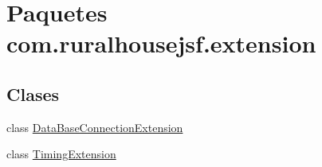 \hypertarget{namespacecom_1_1ruralhousejsf_1_1extension}{}\section{Paquetes com.\+ruralhousejsf.\+extension}
\label{namespacecom_1_1ruralhousejsf_1_1extension}
\subsection*{Clases}
\begin{DoxyCompactItemize}
\item 
class \mbox{\hyperlink{classcom_1_1ruralhousejsf_1_1extension_1_1_data_base_connection_extension}{Data\+Base\+Connection\+Extension}}
\item 
class \mbox{\hyperlink{classcom_1_1ruralhousejsf_1_1extension_1_1_timing_extension}{Timing\+Extension}}
\end{DoxyCompactItemize}
